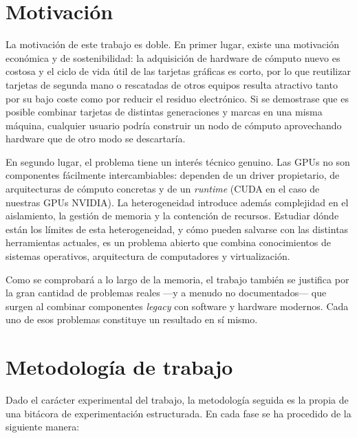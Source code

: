 \section*{Motivación}

La motivación de este trabajo es doble. En primer lugar, existe una motivación económica y de sostenibilidad: 
la adquisición de hardware de cómputo nuevo es costosa y el ciclo de vida útil de las tarjetas gráficas es corto,
por lo que reutilizar tarjetas de segunda mano o rescatadas de otros equipos resulta atractivo tanto por su bajo
coste como por reducir el residuo electrónico. Si se demostrase que es posible combinar tarjetas de distintas 
generaciones y marcas en una misma máquina, cualquier usuario podría construir un nodo de cómputo aprovechando 
hardware que de otro modo se descartaría.

En segundo lugar, el problema tiene un interés técnico genuino. Las GPUs no son componentes fácilmente intercambiables: 
dependen de un driver propietario, de arquitecturas de cómputo concretas y de un \textit{runtime} 
(CUDA en el caso de nuestras GPUs NVIDIA). La heterogeneidad introduce
además complejidad en el aislamiento, la gestión de memoria y la contención de recursos. Estudiar dónde están 
los límites de esta heterogeneidad, y cómo pueden salvarse con las distintas herramientas actuales, 
es un problema abierto que combina conocimientos de sistemas operativos, arquitectura 
de computadores y virtualización.

Como se comprobará a lo largo de la memoria, el trabajo también se justifica por la gran cantidad de problemas
reales ---y a menudo no documentados--- que surgen al combinar componentes \textit{legacy} con software y hardware
modernos. Cada uno de esos problemas constituye un resultado en sí mismo.

\section*{Metodología de trabajo}

Dado el carácter experimental del trabajo, la metodología seguida es la propia de una bitácora de experimentación estructurada. En cada fase se ha procedido de la siguiente manera:

